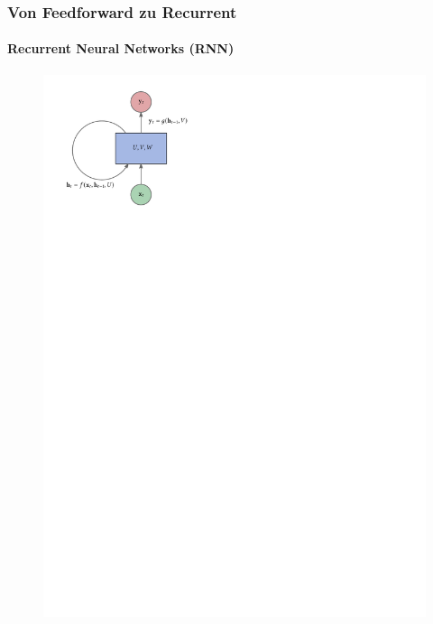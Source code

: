 \documentclass[german,aspectratio=169]{beamer}
\begin{document}
\begin{frame}
	\frametitle{Von Feedforward zu Recurrent}
		\framesubtitle{Recurrent Neural Networks (RNN)}
	\begin{figure}
		\includegraphics[scale=0.9]{rnn-diagram.pdf}
	\end{figure}
\end{frame}
\end{document}
